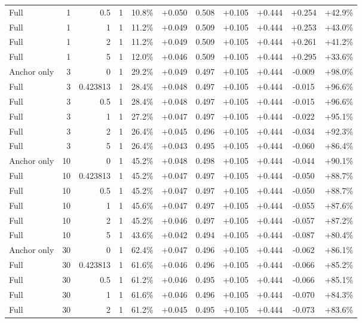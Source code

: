 \begin{table}[htbp]
\begin{tabular}{lrrrccccccc}
Full & 1 & 0.5 & 1 & 10.8\% & +0.050 & 0.508 & +0.105 & +0.444 & +0.254 & +42.9\% \\
Full & 1 & 1 & 1 & 11.2\% & +0.049 & 0.509 & +0.105 & +0.444 & +0.253 & +43.0\% \\
Full & 1 & 2 & 1 & 11.2\% & +0.049 & 0.509 & +0.105 & +0.444 & +0.261 & +41.2\% \\
Full & 1 & 5 & 1 & 12.0\% & +0.046 & 0.509 & +0.105 & +0.444 & +0.295 & +33.6\% \\
Anchor only & 3 & 0 & 1 & 29.2\% & +0.049 & 0.497 & +0.105 & +0.444 & -0.009 & +98.0\% \\
Full & 3 & 0.423813 & 1 & 28.4\% & +0.048 & 0.497 & +0.105 & +0.444 & -0.015 & +96.6\% \\
Full & 3 & 0.5 & 1 & 28.4\% & +0.048 & 0.497 & +0.105 & +0.444 & -0.015 & +96.6\% \\
Full & 3 & 1 & 1 & 27.2\% & +0.047 & 0.497 & +0.105 & +0.444 & -0.022 & +95.1\% \\
Full & 3 & 2 & 1 & 26.4\% & +0.045 & 0.496 & +0.105 & +0.444 & -0.034 & +92.3\% \\
Full & 3 & 5 & 1 & 26.4\% & +0.043 & 0.495 & +0.105 & +0.444 & -0.060 & +86.4\% \\
Anchor only & 10 & 0 & 1 & 45.2\% & +0.048 & 0.498 & +0.105 & +0.444 & -0.044 & +90.1\% \\
Full & 10 & 0.423813 & 1 & 45.2\% & +0.047 & 0.497 & +0.105 & +0.444 & -0.050 & +88.7\% \\
Full & 10 & 0.5 & 1 & 45.2\% & +0.047 & 0.497 & +0.105 & +0.444 & -0.050 & +88.7\% \\
Full & 10 & 1 & 1 & 45.6\% & +0.047 & 0.497 & +0.105 & +0.444 & -0.055 & +87.6\% \\
Full & 10 & 2 & 1 & 45.2\% & +0.046 & 0.497 & +0.105 & +0.444 & -0.057 & +87.2\% \\
Full & 10 & 5 & 1 & 43.6\% & +0.042 & 0.494 & +0.105 & +0.444 & -0.087 & +80.4\% \\
Anchor only & 30 & 0 & 1 & 62.4\% & +0.047 & 0.496 & +0.105 & +0.444 & -0.062 & +86.1\% \\
Full & 30 & 0.423813 & 1 & 61.6\% & +0.046 & 0.496 & +0.105 & +0.444 & -0.066 & +85.2\% \\
Full & 30 & 0.5 & 1 & 61.2\% & +0.046 & 0.495 & +0.105 & +0.444 & -0.066 & +85.1\% \\
Full & 30 & 1 & 1 & 61.6\% & +0.046 & 0.496 & +0.105 & +0.444 & -0.070 & +84.3\% \\
Full & 30 & 2 & 1 & 61.2\% & +0.045 & 0.495 & +0.105 & +0.444 & -0.073 & +83.6\% \\

\end{tabular}
\end{table}

